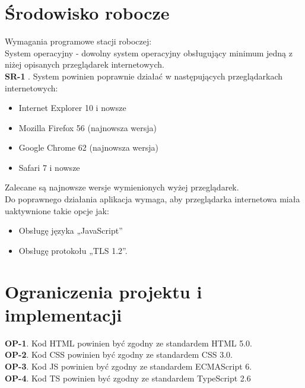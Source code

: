 \documentclass{scrreprt}
\begin{document}
\newpage
\section{ Środowisko robocze}
Wymagania programowe stacji roboczej:\\
System operacyjny - dowolny system operacyjny obsługujący minimum jedną z niżej opisanych przeglądarek internetowych.\\

\textbf{\textcolor{myBlue}{SR-1}} . System powinien poprawnie działać w następujących przeglądarkach internetowych:
\begin{itemize}[label={--}]
\item{Internet Explorer 10 i nowsze}
\item{Mozilla Firefox 56 (najnowsza wersja)}
\item{Google Chrome 62 (najnowsza wersja)}
\item{Safari 7 i nowsze}
\end{itemize}
Zalecane są najnowsze wersje wymienionych wyżej przeglądarek.\\

Do poprawnego działania aplikacja wymaga, aby przeglądarka internetowa miała uaktywnione takie opcje jak: 
\begin{itemize}[label={--}]
\item{Obsługę języka „JavaScript”}
\item{Obsługę protokołu „TLS 1.2”.}
\end{itemize} 

\section{Ograniczenia projektu i implementacji} 
\textbf{\textcolor{myBlue}{OP-1}}. Kod HTML powinien być zgodny ze standardem HTML 5.0. \\
\textbf{\textcolor{myBlue}{OP-2}}. Kod CSS powinien być zgodny ze standardem CSS 3.0. \\
\textbf{\textcolor{myBlue}{OP-3}}. Kod JS powinien być zgodny ze standardem ECMAScript 6. \\
\textbf{\textcolor{myBlue}{OP-4}}. Kod TS powinien być zgodny ze standardem TypeScript 2.6 \\
\end{document}
